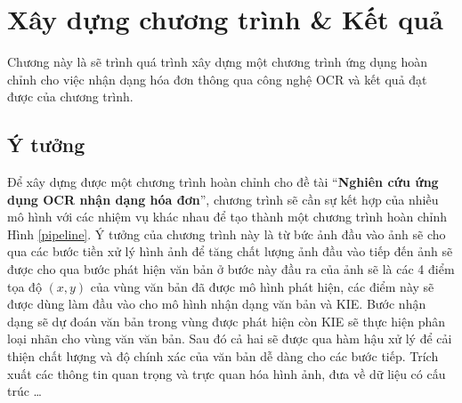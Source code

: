 \chapter{Xây dựng chương trình \& Kết quả}

Chương này là sẽ trình quá trình xây dựng một chương trình ứng dụng hoàn chỉnh cho việc nhận dạng hóa đơn thông qua công nghệ OCR và kết quả đạt được của chương trình.
\section{Ý tưởng}
Để xây dựng được một chương trình hoàn chỉnh cho đề tài ``\textbf{Nghiên cứu ứng dụng OCR nhận dạng hóa đơn}'', chương trình sẽ cần sự kết hợp của nhiều mô hình với các nhiệm vụ khác nhau để tạo thành một chương trình hoàn chỉnh Hình \ref{pipeline}. Ý tưởng của chương trình này là từ bức ảnh đầu vào ảnh sẽ cho qua các bước tiền xử lý hình ảnh để tăng chất lượng ảnh đầu vào tiếp đến ảnh sẽ được cho qua bước phát hiện văn bản ở bước này đầu ra của ảnh sẽ là các 4 điểm tọa độ $(x, y)$ của vùng văn bản đã được mô hình phát hiện, các điểm này sẽ được dùng làm đầu vào cho mô hình nhận dạng văn bản và KIE. Bước nhận dạng sẽ dự đoán văn bản trong vùng được phát hiện còn KIE sẽ thực hiện phân loại nhãn cho vùng văn văn bản. Sau đó cả hai sẽ được qua hàm hậu xử lý để cải thiện chất lượng và độ chính xác của văn bản dễ dàng cho các bước tiếp. Trích xuất các thông tin quan trọng và trực quan hóa hình ảnh, đưa về dữ liệu có cấu trúc \ldots
